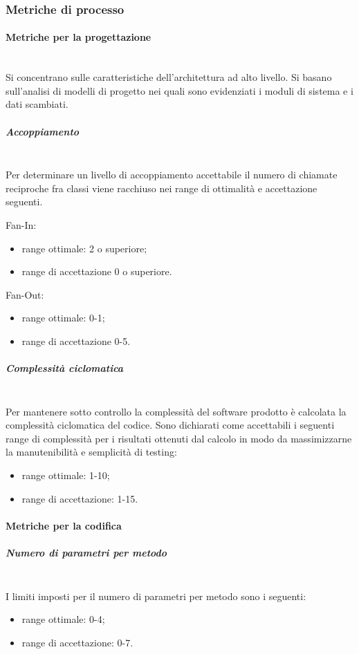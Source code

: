 \subsubsection{Metriche di processo}\label{sec:metriche_processo}

\paragraph{Metriche per la progettazione}\mbox{}\\
Si concentrano sulle caratteristiche dell'architettura ad alto livello. Si basano sull'analisi di modelli di progetto nei quali sono evidenziati i moduli di sistema e i dati scambiati.

\subparagraph{Accoppiamento}\mbox{}\\
Per determinare un livello di accoppiamento accettabile il numero di chiamate reciproche fra classi viene racchiuso nei range di ottimalità e accettazione seguenti.

Fan-In:
\begin{itemize}
	\item range ottimale: 2 o superiore;
	\item range di accettazione 0 o superiore.
\end{itemize}

Fan-Out:
\begin{itemize}
	\item range ottimale: 0-1;
	\item range di accettazione 0-5.
\end{itemize}

\subparagraph{Complessità ciclomatica}\mbox{}\\
Per mantenere sotto controllo la complessità del software prodotto è calcolata la complessità ciclomatica del codice. 
Sono dichiarati come accettabili i seguenti range di complessità per i risultati ottenuti dal calcolo in modo da massimizzarne la manutenibilità e semplicità di testing: 
\begin{itemize}
	\item range ottimale: 1-10;
	\item range di accettazione: 1-15.
\end{itemize}

\paragraph{Metriche per la codifica}\mbox{}

\subparagraph{Numero di parametri per metodo}\mbox{}\\
I limiti imposti per il numero di parametri per metodo sono i seguenti:
\begin{itemize}
	\item range ottimale: 0-4;
	\item range di accettazione: 0-7.
\end{itemize}

